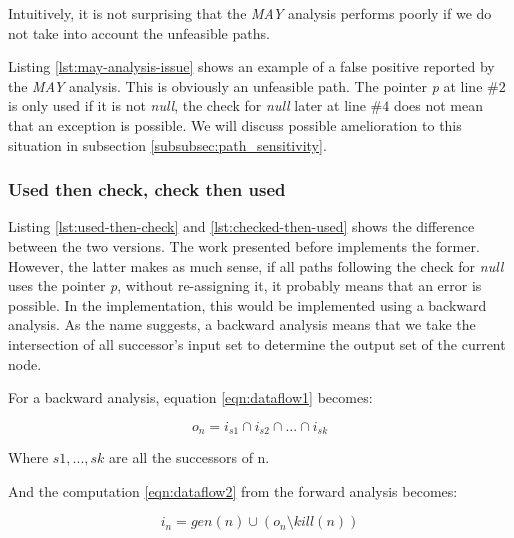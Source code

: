 Intuitively, it is not surprising that the \emph{MAY} analysis performs poorly if we do not take into account the unfeasible paths.



Listing \ref{lst:may-analysis-issue} shows an example of a false positive reported by the \emph{MAY} analysis. 
This is obviously an unfeasible path.
The pointer \emph{p} at line $\#2$ is only used if it is not \emph{null}, the check for \emph{null} later at line $\#4$ does not mean that an exception is possible.
We will discuss possible amelioration to this situation in subsection \ref{subsubsec:path_sensitivity}.

\subsubsection{Used then check, check then used}
\label{subsubsec:used_then_check_check_then_used}




Listing \ref{lst:used-then-check} and \ref{lst:checked-then-used} shows the difference between the two versions.
The work presented before implements the former.
However, the latter makes as much sense, if all paths following the check for \emph{null} uses the pointer \emph{p}, without re-assigning it, it probably means that an error is possible.
In the implementation, this would be implemented using a backward analysis. 
As the name suggests, a backward analysis means that we take the intersection of all successor’s input set to determine the output set of the current node. 

For a backward analysis, equation \eqref{eqn:dataflow1} becomes:

\begin{equation}\label{eqn:checkthenused1}
o_{n} = i_{s1}  \cap   i_{s2}  \cap  ... \cap   i_{sk}
\end{equation}

Where $s1, ..., sk$ are all the successors of n.

And the computation \eqref{eqn:dataflow2} from the forward analysis becomes:

\begin{equation}\label{eqn:checkthenused2}
i_{n} = gen(n)  \cup   (o_{n} \setminus kill(n))
\end{equation}

